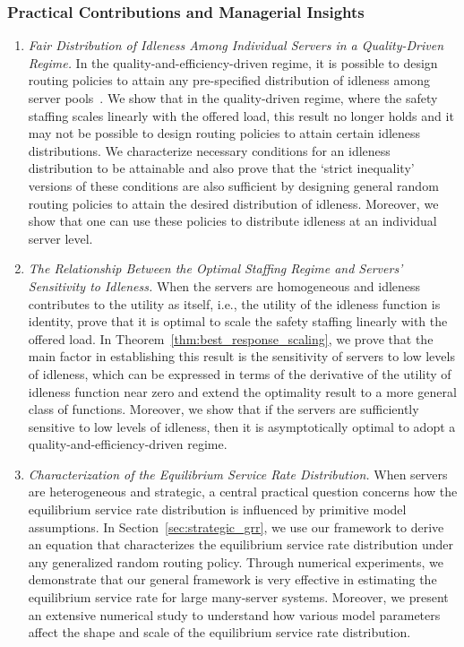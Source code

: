 \documentclass[a4paper,11pt,twoside]{article}
\numberwithin{equation}{section}
\numberwithin{figure}{section}
\theoremstyle{plain}
\newcommand{\1}{\mathbbm{1}}
\begin{document}
\noindent\subsubsection*{Practical Contributions and Managerial Insights}
\begin{enumerate}
    \item \emph{Fair Distribution of Idleness Among Individual Servers in a Quality-Driven Regime.} 
    In the quality-and-efficiency-driven regime, it is possible to design routing policies to attain any pre-specified distribution of idleness among server pools~\cites{atarschwartzshaki11, armward10, reedshaki2015, wararm13}. 
    We show that in the quality-driven regime, where the safety staffing scales linearly with the offered load, this result no longer holds and it may not be possible to design routing policies to attain certain idleness distributions. We characterize necessary conditions for an idleness distribution to be attainable and also prove that the `strict inequality' versions of these conditions are also sufficient by designing general random routing policies to attain the desired distribution of idleness. Moreover, we show that one can use these policies to distribute idleness at an individual server level.

    \item \emph{The Relationship Between the Optimal Staffing Regime and Servers' Sensitivity to Idleness.} When the servers are homogeneous and idleness contributes to the utility as itself, i.e., the utility of the idleness function is identity, \cite{Gopalakrishnan_etal2016} prove that it is optimal to scale the safety staffing linearly with the offered load. In Theorem~\ref{thm:best_response_scaling}, we prove that the main factor in establishing this result is the sensitivity of servers to low levels of idleness, which can be expressed in terms of the derivative of the utility of idleness function near zero and extend the optimality result to a more general class of functions. Moreover, we show that if the servers are sufficiently sensitive to low levels of idleness, then it is asymptotically optimal to adopt a quality-and-efficiency-driven regime.

    \item \emph{Characterization of the Equilibrium Service Rate Distribution.} When servers are heterogeneous and strategic, a central practical question concerns how the equilibrium service rate distribution is influenced by primitive model assumptions. 
    In Section~\ref{sec:strategic_grr}, we use our framework to derive an equation that characterizes the equilibrium service rate distribution under any generalized random routing policy. 
    Through numerical experiments, we demonstrate that our general framework is very effective in estimating the equilibrium service rate for large many-server systems. 
    Moreover, we present an extensive numerical study to understand how various model parameters affect the shape and scale of the equilibrium service rate distribution. 

    
\end{enumerate}
\end{document}
